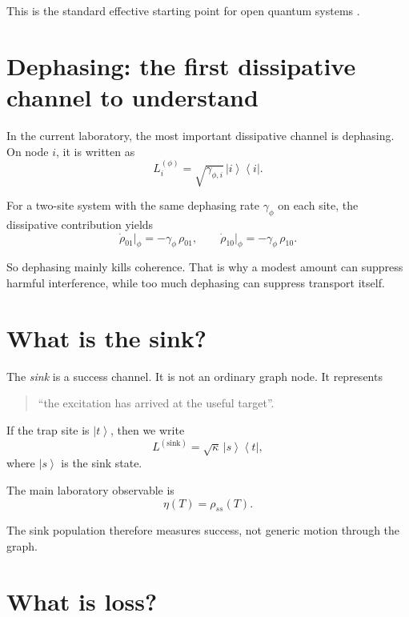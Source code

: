 \documentclass[11pt,a4paper]{article}
\newcommand{\ket}[1]{\left|#1\right\rangle}
\newcommand{\bra}[1]{\left\langle#1\right|}
\begin{document}
This is the standard effective starting point for open quantum systems
\citep{breuer_petruccione_2007, rivas_huelga_2012}.

\section{Dephasing: the first dissipative channel to understand}

In the current laboratory, the most important dissipative channel is dephasing.
On node $i$, it is written as
\begin{equation}
L_i^{(\phi)} = \sqrt{\gamma_{\phi,i}}\,\ket{i}\bra{i}.
\end{equation}

For a two-site system with the same dephasing rate $\gamma_\phi$ on each site,
the dissipative contribution yields
\begin{equation}
\dot{\rho}_{01}\Big|_{\phi} = -\gamma_\phi\,\rho_{01},
\qquad
\dot{\rho}_{10}\Big|_{\phi} = -\gamma_\phi\,\rho_{10}.
\end{equation}

So dephasing mainly kills coherence. That is why a modest amount can suppress
harmful interference, while too much dephasing can suppress transport itself.

\section{What is the sink?}

The \emph{sink} is a success channel. It is not an ordinary graph node. It represents
\begin{quote}
``the excitation has arrived at the useful target''.
\end{quote}

If the trap site is $\ket{t}$, then we write
\begin{equation}
L^{(\mathrm{sink})} = \sqrt{\kappa}\,\ket{s}\bra{t},
\end{equation}
where $\ket{s}$ is the sink state.

The main laboratory observable is
\begin{equation}
\eta(T)=\rho_{ss}(T).
\end{equation}

The sink population therefore measures success, not generic motion through the graph.

\section{What is loss?}
\end{document}
